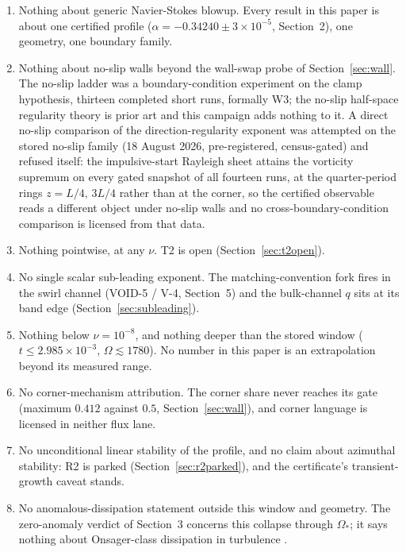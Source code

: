 \begin{enumerate}
\item Nothing about generic Navier-Stokes blowup. Every result in this
paper is about one certified profile
($\alpha = -0.34240 \pm 3\times10^{-5}$, Section~2), one geometry, one
boundary family.
\item Nothing about no-slip walls beyond the wall-swap probe of
Section~\ref{sec:wall}. The no-slip ladder was a boundary-condition
experiment on the clamp hypothesis, thirteen completed short runs,
formally W3;
the no-slip half-space regularity theory is prior art
\cite{GigaMiura2011, BarkerPrange2020} and this campaign adds nothing
to it. A direct no-slip comparison of the direction-regularity exponent
was attempted on the stored no-slip family (18 August 2026, pre-registered,
census-gated) and refused itself: the impulsive-start Rayleigh sheet attains
the vorticity supremum on every gated snapshot of all fourteen runs, at the
quarter-period rings $z = L/4,\,3L/4$ rather than at the corner, so the
certified observable reads a different object under no-slip walls and no
cross-boundary-condition comparison is licensed from that data.
\item Nothing pointwise, at any $\nu$. T2 is open
(Section~\ref{sec:t2open}).
\item No single scalar sub-leading exponent. The matching-convention
fork fires in the swirl channel (VOID-5 / V-4, Section~5) and the
bulk-channel $q$ sits at its band edge
(Section~\ref{sec:subleading}).
\item Nothing below $\nu = 10^{-8}$, and nothing deeper than the stored
window ($t \le 2.985\times10^{-3}$, $\Omega \lesssim 1780$). No number
in this paper is an extrapolation beyond its measured range.
\item No corner-mechanism attribution. The corner share never reaches
its gate (maximum $0.412$ against $0.5$, Section~\ref{sec:wall}), and
corner language is licensed in neither flux lane.
\item No unconditional linear stability of the profile, and no claim
about azimuthal stability: R2 is parked
(Section~\ref{sec:r2parked}), and the certificate's transient-growth
caveat stands.
\item No anomalous-dissipation statement outside this window and
geometry. The zero-anomaly verdict of Section~3 concerns this collapse
through $\Omega_*$; it says nothing about Onsager-class dissipation in
turbulence \cite{Onsager1949, DuchonRobert2000}.
\end{enumerate}
